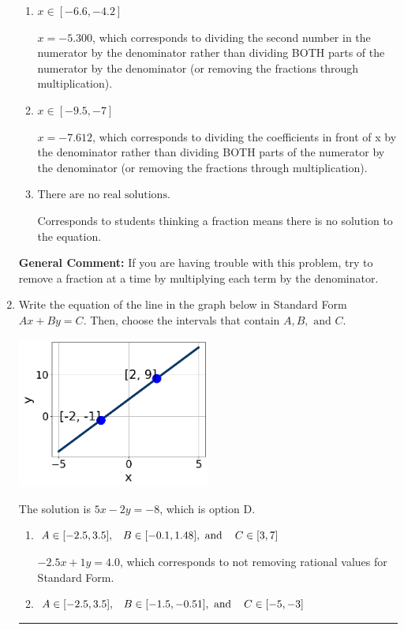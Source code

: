 \documentclass{extbook}[14pt]
\newcommand{\litem}[1]{\item #1

\rule{\textwidth}{0.4pt}}
\begin{document}
\begin{enumerate}
{\begin{enumerate}[label=\Alph*.]
* $x = -2.373$, which is the correct option.
\item \( x \in [-6.6, -4.2] \)

 $x = -5.300$, which corresponds to dividing the second number in the numerator by the denominator rather than dividing BOTH parts of the numerator by the denominator (or removing the fractions through multiplication).
\item \( x \in [-9.5, -7] \)

 $x = -7.612$, which corresponds to dividing the coefficients in front of x by the denominator rather than dividing BOTH parts of the numerator by the denominator (or removing the fractions through multiplication).
\item \( \text{There are no real solutions.} \)

Corresponds to students thinking a fraction means there is no solution to the equation.
\end{enumerate}

\textbf{General Comment:} If you are having trouble with this problem, try to remove a fraction at a time by multiplying each term by the denominator.
}
\litem{
Write the equation of the line in the graph below in Standard Form $Ax+By=C$. Then, choose the intervals that contain $A, B, \text{ and } C$.

\begin{center}
    \includegraphics[width=0.5\textwidth]{../Figures/linearGraphToStandardC.png}
\end{center}


The solution is \( 5x - 2y = -8 \), which is option D.\begin{enumerate}[label=\Alph*.]
\item \( A \in [-2.5, 3.5], \hspace{3mm} B \in [-0.1, 1.48], \text{ and } \hspace{3mm} C \in [3, 7] \)

 $-2.5x + 1y = 4.0$, which corresponds to not removing rational values for Standard Form.
\item \( A \in [-2.5, 3.5], \hspace{3mm} B \in [-1.5, -0.51], \text{ and } \hspace{3mm} C \in [-5, -3] \)


\end{enumerate}}
\end{enumerate}
\end{document}
